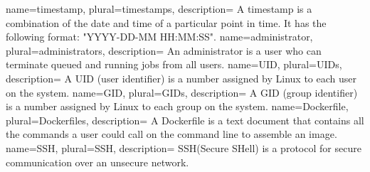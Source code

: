 {
  name=timestamp,
  plural=timestamps,
  description={
    A timestamp is a combination of the date and time of a particular point in time.
    It has the following format: "YYYY-DD-MM HH:MM:SS".
  }
}
{
  name=administrator,
  plural=administrators,
  description={
    An administrator is a user who can terminate queued and running jobs from all users.
  }
}
{
  name=UID,
  plural=UIDs,
  description={
    A UID (user identifier) is a number assigned by Linux to each user on the system.
  }
}
{
  name=GID,
  plural=GIDs,
  description={
    A GID (group identifier) is a number assigned by Linux to each group on the system.
  }
}
{
  name=Dockerfile,
  plural=Dockerfiles,
  description={
     A Dockerfile is a text document that contains all the commands a user could call on the
     command line to assemble an image.
  }
}
{
  name=SSH,
  plural=SSH,
  description={
    SSH(Secure SHell) is a protocol for secure communication over an unsecure network.
  }
}

